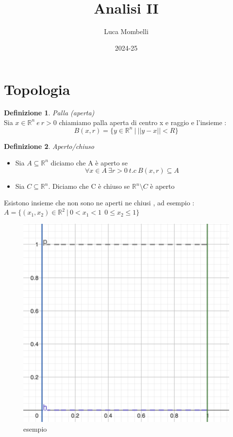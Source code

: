 \documentclass{article}
\title{Analisi II }
\author{Luca Mombelli}
\date{2024-25}
\theoremstyle{definition}
\newtheorem*{definizione}{Definizione}
\newcommand{\R}{\mathbb{R}}
\newcommand{\Rn}{\R^n}
\begin{document}
	
	\maketitle
	\tableofcontents
	\newpage
	
	\section{Topologia}
	\begin{definizione}
		\textit{Palla (aperta)} \\ 
		Sia $x\in \Rn \ e \ r > 0$ chiamiamo palla aperta di centro x e raggio e l'insieme : 
		$$B(x,r)=\{y\in \Rn \ | \  ||y-x||<R\}$$
	\end{definizione}
	\begin{definizione}
		\textit{ Aperto/chiuso} 
		\begin{itemize}
			\item Sia $A \subseteq \Rn$ diciamo che A è aperto se 
			$$\forall x \in A \ \exists r> 0 \ t.c \ B(x,r)\subseteq A $$
			\item Sia $C \subseteq \Rn$. Diciamo che C è chiuso se $\Rn \setminus C$ è aperto
		\end{itemize}
	\end{definizione}
	Esistono insieme che non sono ne aperti ne chiusi , ad esempio : \\$A=\{(x_1,x_2)\in \R^2 \ | \ 0<x_1<1 \ \ 0\leq x_2 \leq 1 \} $ 
	\begin{figure}[h]
		\centering
		\includegraphics[scale=0.25]{immagini/Screenshot 2024-10-02 alle 19.54.09.png}
		\caption{esempio}
		\label{fig:es}
	\end{figure} \\
\end{document}
